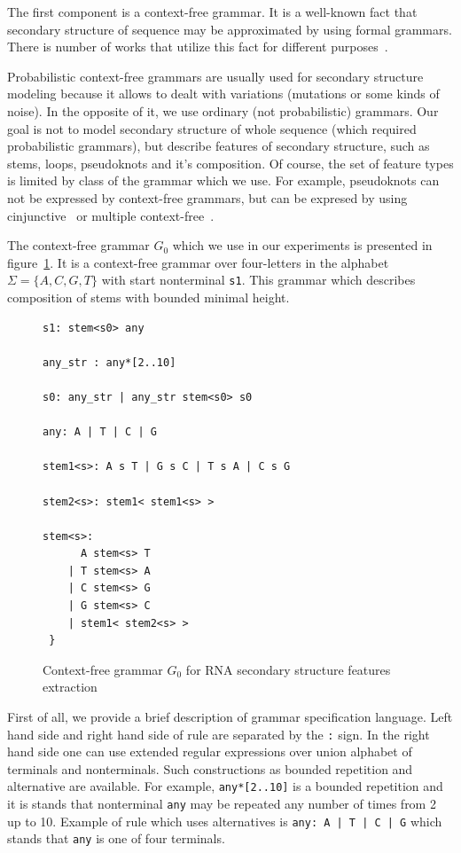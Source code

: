 \documentclass[a4paper,twoside]{article}
\begin{document}
\noindent The first component is a context-free grammar. 
It is a well-known fact that secondary structure of sequence may be approximated by using formal grammars.
There is number of works that utilize this fact for different purposes~\cite{!!!!}.

Probabilistic context-free grammars are usually used for secondary structure modeling because it allows to dealt with variations (mutations or some kinds of noise).
In the opposite of it, we use ordinary (not probabilistic) grammars.
Our goal is not to model secondary structure of whole sequence (which required probabilistic grammars), but describe features of secondary structure, such as stems, loops, pseudoknots and it's composition.
Of course, the set of feature types is limited by class of the grammar which we use.
For example, pseudoknots can not be expressed by context-free grammars, but can be expresed by using cinjunctive~\cite{KanchanDevi2017,zier2013rna,Okhotin:2001:CG:543313.543323} or multiple context-free~\cite{SEKI1991191,Riechert:2016:ADP:2972703.2972851}.

The context-free grammar $G_0$ which we use in our experiments is presented in figure~\ref{fig:cfg-rna}.
It is a context-free grammar over four-letters in the alphabet $\Sigma=\{A,C,G,T\}$ with start nonterminal \verb|s1|.
This grammar which describes composition of stems with bounded minimal height.

\begin{figure}
\begin{verbatim}
s1: stem<s0> any

any_str : any*[2..10]

s0: any_str | any_str stem<s0> s0

any: A | T | C | G

stem1<s>: A s T | G s C | T s A | C s G 

stem2<s>: stem1< stem1<s> >

stem<s>:  
      A stem<s> T 
    | T stem<s> A 
    | C stem<s> G 
    | G stem<s> C 
    | stem1< stem2<s> >  
 } 
\end{verbatim}
\caption{Context-free grammar $G_0$ for RNA secondary structure features extraction}
\label{fig:cfg-rna}
\end{figure}

First of all, we provide a brief description of grammar specification language.
Left hand side and right hand side of rule are separated by the \verb|:| sign.
In the right hand side one can use extended regular expressions over union alphabet of terminals and nonterminals.
Such constructions as bounded repetition and alternative are available.
For example, \verb|any*[2..10]| is a bounded repetition and it is stands that nonterminal \verb|any| may be repeated any number of times from 2 up to 10.
Example of rule which uses alternatives is \texttt{any: A | T | C | G} which stands that \verb|any| is one of four terminals.
\end{document}
